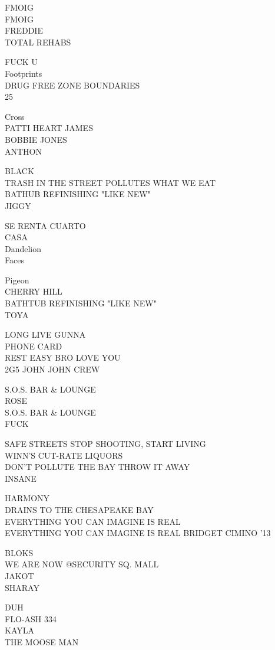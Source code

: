 \documentclass[10pt,letterpaper]{article}
\begin{document}
FMOIG\\
FMOIG\\
FREDDIE\\
TOTAL REHABS

FUCK U\\
Footprints\\
DRUG FREE ZONE BOUNDARIES\\
25

Cross\\
PATTI HEART JAMES\\
BOBBIE JONES\\
ANTHON

BLACK\\
TRASH IN THE STREET POLLUTES WHAT WE EAT\\
BATHUB REFINISHING "LIKE NEW"\\
JIGGY

SE RENTA CUARTO\\
CASA\\
Dandelion\\
Faces

Pigeon\\
CHERRY HILL\\
BATHTUB REFINISHING "LIKE NEW"\\
TOYA

LONG LIVE GUNNA\\
PHONE CARD\\
REST EASY BRO LOVE YOU\\
2G5 JOHN JOHN CREW

S.O.S. BAR \& LOUNGE\\
ROSE\\
S.O.S. BAR \& LOUNGE\\
FUCK

SAFE STREETS STOP SHOOTING, START LIVING\\
WINN'S CUT{-}RATE LIQUORS\\
DON'T POLLUTE THE BAY THROW IT AWAY\\
INSANE

HARMONY\\
DRAINS TO THE CHESAPEAKE BAY\\
EVERYTHING YOU CAN IMAGINE IS REAL\\
EVERYTHING YOU CAN IMAGINE IS REAL BRIDGET CIMINO '13

BLOKS\\
WE ARE NOW @SECURITY SQ. MALL\\
JAKOT\\
SHARAY

DUH\\
FLO{-}ASH 334\\
KAYLA\\
THE MOOSE MAN
\end{document}
